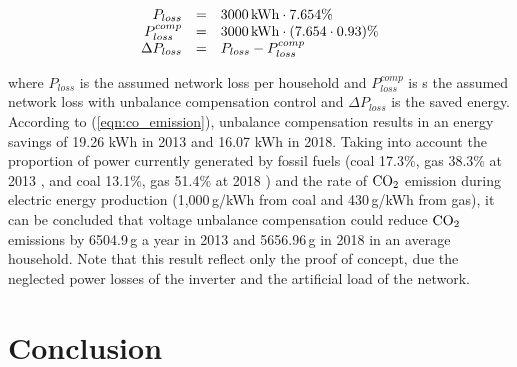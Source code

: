             \begin{equation}
                \label{eqn:co_emission}
                \begin{array}{rcl}
                 P_{loss}&=&3000\,\textnormal{kWh}\cdot7.654\%\\
                P^{comp}_{loss}&=&3000\,\textnormal{kWh}\cdot(7.654\cdot0.93)\%\\
                 \Delta P_{loss}&=&P_{loss}-P^{comp}_{loss}\\
                 \end{array}
                \end{equation}

            where $P_{loss}$ is the assumed network loss per household and $P^{comp}_{loss}$ is s the assumed network loss with unbalance compensation control and $\Delta P_{loss}$ is the saved energy. According to (\ref{eqn:co_emission}), unbalance compensation results in an energy savings of 19.26 kWh in 2013 and 16.07 kWh in 2018. Taking into account the proportion of power currently generated by fossil fuels (coal 17.3\%, gas 38.3\% at 2013 \cite{MVM2013}, \cite{gorbe2012reduction} and coal 13.1\%, gas 51.4\% at 2018 \cite{MVM2018}) and the rate of $\textnormal{CO}_2$ emission during electric energy production (1,000\,g/kWh from coal and 430\,g/kWh from gas), it can be concluded that voltage unbalance compensation could reduce $\textnormal{CO}_2$ emissions by 6504.9\,g a year in 2013 and 5656.96\,g in 2018 in an average household. Note that this result reflect only the proof of concept, due the neglected power losses of the inverter and the artificial load of the network. 
						

\section{Conclusion}\label{VUB:sec:Conclusion}

